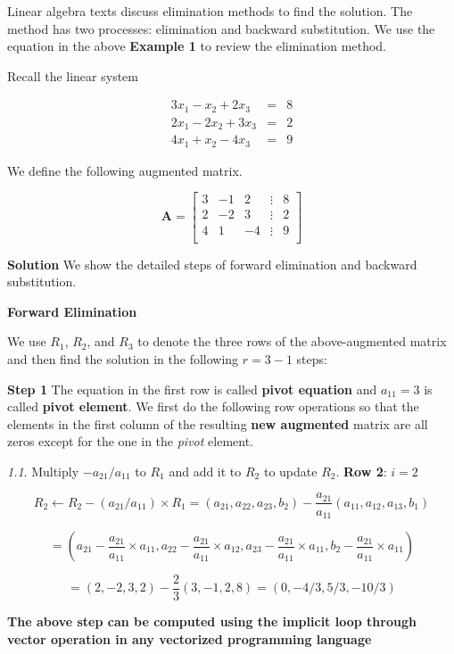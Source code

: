 \documentclass[
]{book}
\begin{document}
Linear algebra texts discuss elimination methods to find the solution. The method has two processes: elimination and backward substitution. We use the equation in the above \textbf{Example 1} to review the elimination method.

Recall the linear system

\[
\begin{array}{ccc}
3x_1 - x_2 + 2x_3 & = & 8  \\ 
2x_1 - 2x_2 + 3x_3 & = & 2 \\ 
4x_1 + x_2 - 4x_3 & = & 9 
\end{array}
\]

We define the following augmented matrix.

\[
\mathbf{A} = \left[
\begin{array}{ccccc}
 3 & -1 & 2 & \vdots & 8\\ 
 2 & -2 & 3 & \vdots & 2\\ 
 4 & 1 & -4 & \vdots & 9\\ 
\end{array}
\right]
\]

\textbf{Solution} We show the detailed steps of forward elimination and backward substitution.

\textbf{Forward Elimination}

We use \(R_1\), \(R_2\), and \(R_3\) to denote the three rows of the above-augmented matrix and then find the solution in the following \(r = 3 - 1\) steps:

\textbf{Step 1} The equation in the first row is called \textbf{pivot equation} and \(a_{11} = 3\) is called \textbf{pivot element}. We first do the following row operations so that the elements in the first column of the resulting \textbf{new augmented} matrix are all zeros except for the one in the \emph{pivot} element.

\emph{1.1}. Multiply \(-a_{21}/a_{11}\) to \(R_1\) and add it to \(R_2\) to update \(R_2\). \textbf{Row 2}: \(i = 2\)

\[
R_2 \leftarrow R_2 -(a_{21}/a_{11})\times R_1  = (a_{21}, a_{22}, a_{23}, b_2) - \frac{a_{21}}{a_{11}}(a_{11}, a_{12}, a_{13}, b_1)
\]

\[
= (a_{21} - \frac{a_{21}}{a_{11}}\times a_{11}, a_{22} - \frac{a_{21}}{a_{11}}\times a_{12}, a_{23}-\frac{a_{21}}{a_{11}}\times a_{11}, b_2-\frac{a_{21}}{a_{11}}\times a_{11})
\]

\[
=(2,-2, 3, 2) - \frac{2}{3}(3,-1,2,8)  = (0, -4/3, 5/3, -10/3)
\]

\textbf{\color{red}The above step can be computed using the implicit loop through vector operation in any vectorized programming language}
\end{document}
